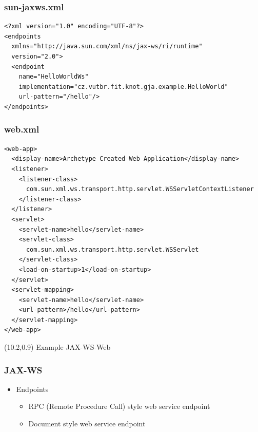 \documentclass[10pt,xcolor=pdflatex]{beamer}
\begin{document}
\begin{frame}[containsverbatim]\frametitle{sun-jaxws.xml}
\begin{footnotesize}
          \begin{verbatim}
<?xml version="1.0" encoding="UTF-8"?>
<endpoints
  xmlns="http://java.sun.com/xml/ns/jax-ws/ri/runtime"
  version="2.0">
  <endpoint
    name="HelloWorldWs"
    implementation="cz.vutbr.fit.knot.gja.example.HelloWorld"
    url-pattern="/hello"/>
</endpoints>
\end{verbatim}
\end{footnotesize}
\end{frame}


\begin{frame}[containsverbatim]\frametitle{web.xml}
\begin{footnotesize}
          \begin{verbatim}
<web-app>
  <display-name>Archetype Created Web Application</display-name>
  <listener>
    <listener-class>
      com.sun.xml.ws.transport.http.servlet.WSServletContextListener
    </listener-class>
  </listener>
  <servlet>
    <servlet-name>hello</servlet-name>
    <servlet-class>
      com.sun.xml.ws.transport.http.servlet.WSServlet
    </servlet-class>
    <load-on-startup>1</load-on-startup>
  </servlet>
  <servlet-mapping>
    <servlet-name>hello</servlet-name>
    <url-pattern>/hello</url-pattern>
  </servlet-mapping>
</web-app>
\end{verbatim}
\end{footnotesize}
\begin{textblock}{5}(10.2,0.9)
    {\footnotesize Example JAX-WS-Web}
\end{textblock}
\end{frame}


\begin{frame}[containsverbatim]\frametitle{JAX-WS}
\begin{itemize}
  \item Endpoints
    \begin{itemize}
      \item RPC (Remote Procedure Call) style web service endpoint
      \item Document style web service endpoint
    \end{itemize}
\end{itemize}
\end{frame}
\end{document}

